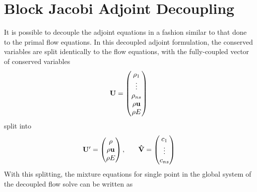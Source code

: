 \section{Block Jacobi Adjoint Decoupling}
\label{block-jacobi-decoupling}

It is possible to decouple the adjoint equations in a fashion similar to that
done to the primal flow equations.  In this decoupled adjoint formulation, the
conserved variables are split identically to the flow equations, with the
fully-coupled vector of conserved variables
\begin{equation}
	\mathbf U =
  \begin{pmatrix}
 		\rho_1    \\
		\vdots    \\
		\rho_{ns} \\
    \rho \mathbf u  \\
		\rho E    \\
	\end{pmatrix}
  \label{all-vars}
 \end{equation}
 split into
\begin{equation}
	\begin{matrix}
		\mathbf{U}'=\begin{pmatrix}
			\rho \\
			\rho \mathbf u \\
			\rho E
		\end{pmatrix},\quad &
		\mathbf{\mathbf{\hat{V}}}=\begin{pmatrix}
			c_1 \\
			\vdots \\
			c_{ns}
		\end{pmatrix}
	\end{matrix}
  \label{dc-vars}
\end{equation}
With this splitting, the mixture equations for single point in the global system
of the decoupled flow solve can be written as
